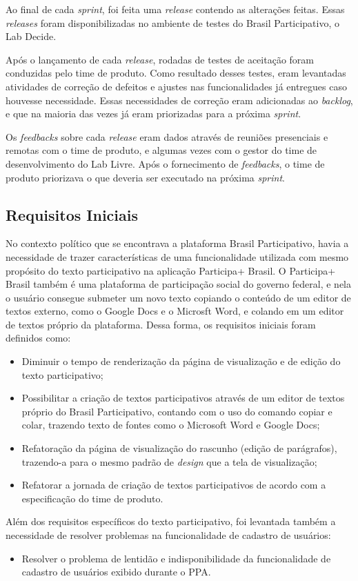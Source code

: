 Ao final de cada \textit{sprint}, foi feita uma \textit{release} contendo as alterações feitas. Essas \textit{releases} foram disponibilizadas no ambiente de testes do Brasil Participativo, o Lab Decide.

Após o lançamento de cada \textit{release}, rodadas de testes de aceitação foram conduzidas pelo time de produto.
Como resultado desses testes, eram levantadas atividades de correção de defeitos e ajustes nas funcionalidades já entregues caso houvesse necessidade. Essas necessidades de correção eram adicionadas ao \textit{backlog}, e que na maioria das vezes já eram priorizadas para a próxima \textit{sprint}.

Os \textit{feedbacks} sobre cada \textit{release} eram dados através de reuniões presenciais e remotas com o time de produto, e algumas vezes com o gestor do time de desenvolvimento do Lab Livre.
Após o fornecimento de \textit{feedbacks}, o time de produto priorizava o que deveria ser executado na próxima \textit{sprint}.

\subsection {Requisitos Iniciais}
\label{sec:requisitos-iniciais}

No contexto político que se encontrava a plataforma Brasil Participativo, havia a necessidade de trazer características de uma funcionalidade utilizada com mesmo propósito do texto participativo na aplicação Participa+ Brasil. O Participa+ Brasil também é uma plataforma de participação social do governo federal, e nela o usuário consegue submeter um novo texto copiando o conteúdo de um editor de textos externo, como o Google Docs e o Microsft Word, e colando em um editor de textos próprio da plataforma.
Dessa forma, os requisitos iniciais foram definidos como:

\begin{itemize}
	\item Diminuir o tempo de renderização da página de visualização e de edição do texto participativo;
	\item Possibilitar a criação de textos participativos através de um editor de textos próprio do Brasil Participativo, contando com o uso do comando copiar e colar, trazendo texto de fontes como o Microsoft Word e Google Docs;
	\item Refatoração da página de visualização do rascunho (edição de parágrafos), trazendo-a para o mesmo padrão de \textit{design} que a tela de visualização;
	\item Refatorar a jornada de criação de textos participativos de acordo com a especificação do time de produto.
\end{itemize}

Além dos requisitos específicos do texto participativo, foi levantada também a necessidade de resolver problemas na funcionalidade de cadastro de usuários:

\begin{itemize}
	\item Resolver o problema de lentidão e indisponibilidade da funcionalidade de cadastro de usuários exibido durante o PPA.
\end{itemize}